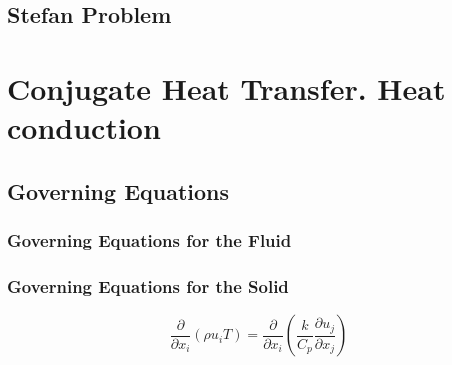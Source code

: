 \subsection{Stefan Problem}

\section{Conjugate Heat Transfer. Heat conduction}

\subsection{Governing Equations}
\subsubsection{Governing Equations for the Fluid}

\subsubsection{Governing Equations for the Solid}

\begin{equation}
	\frac{\partial}{\partial x_{i}}\left(\rho u_{i} T\right)=\frac{\partial}{\partial x_{i}}\left(\frac{k}{C_{p}} \frac{\partial u_{j}}{\partial x_{j}}\right)
\end{equation}
%
%


